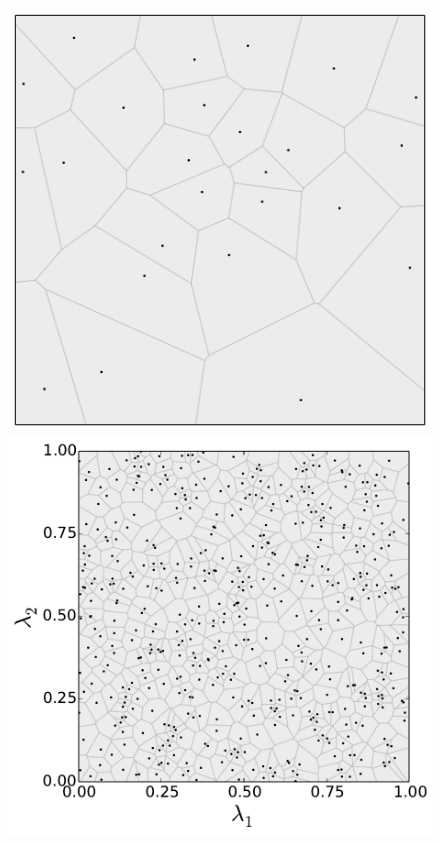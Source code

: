 \begin{figure}[ht]
\centering
	\begin{minipage}{.275\textwidth}
		\includegraphics[width=\linewidth]{./images/voronoi_diagram_N25_r0_no_label}
	\end{minipage}
	\begin{minipage}{.4\textwidth}
		\includegraphics[width=\linewidth]{./images/voronoi_diagram_N500_r50}

\end{minipage}
\end{figure}
